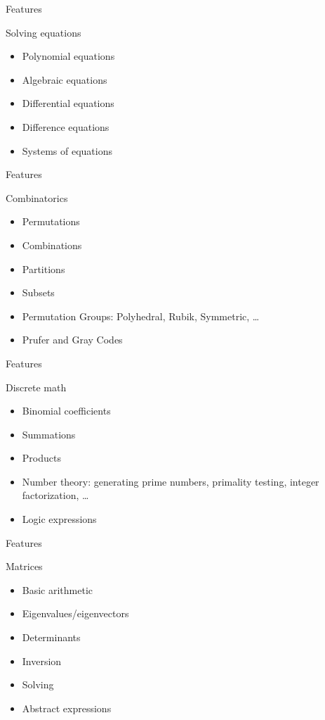 \documentclass[xcolor=svgnames]{beamer}
\begin{document}
\begin{frame}{Features}
\begin{block}{Solving equations}
\begin{itemize}
\item Polynomial equations
\item Algebraic equations
\item Differential equations
\item Difference equations
\item Systems of equations
\end{itemize}
\end{block}
\end{frame}

\begin{frame}{Features}
\begin{block}{Combinatorics}
\begin{itemize}
\item Permutations
\item Combinations
\item Partitions
\item Subsets
\item Permutation Groups: Polyhedral, Rubik, Symmetric, \ldots
\item Prufer and Gray Codes
\end{itemize}
\end{block}
\end{frame}

\begin{frame}{Features}
\begin{block}{Discrete math}
\begin{itemize}
\item Binomial coefficients
\item Summations
\item Products
\item Number theory: generating prime numbers, primality testing, integer
  factorization, \ldots
\item Logic expressions
\end{itemize}
\end{block}
\end{frame}

\begin{frame}{Features}
\begin{block}{Matrices}
\begin{itemize}
\item Basic arithmetic
\item Eigenvalues/eigenvectors
\item Determinants
\item Inversion
\item Solving
\item Abstract expressions
\end{itemize}
\end{block}
\end{frame}
\end{document}
